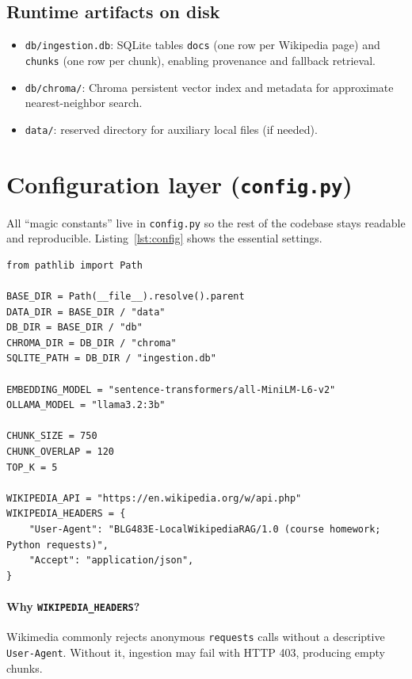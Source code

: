 \documentclass[11pt,a4paper]{article}
\begin{document}
\subsection{Runtime artifacts on disk}
\begin{itemize}[leftmargin=*]
  \item \texttt{db/ingestion.db}: SQLite tables \texttt{docs} (one row per Wikipedia page) and
        \texttt{chunks} (one row per chunk), enabling provenance and fallback retrieval.
  \item \texttt{db/chroma/}: Chroma persistent vector index and metadata for approximate
        nearest-neighbor search.
  \item \texttt{data/}: reserved directory for auxiliary local files (if needed).
\end{itemize}

\section{Configuration layer (\texttt{config.py})}

All ``magic constants'' live in \texttt{config.py} so the rest of the codebase stays readable
and reproducible. Listing~\ref{lst:config} shows the essential settings.

\begin{lstlisting}[caption={Central paths and model identifiers (\texttt{config.py}).},label={lst:config}]
from pathlib import Path

BASE_DIR = Path(__file__).resolve().parent
DATA_DIR = BASE_DIR / "data"
DB_DIR = BASE_DIR / "db"
CHROMA_DIR = DB_DIR / "chroma"
SQLITE_PATH = DB_DIR / "ingestion.db"

EMBEDDING_MODEL = "sentence-transformers/all-MiniLM-L6-v2"
OLLAMA_MODEL = "llama3.2:3b"

CHUNK_SIZE = 750
CHUNK_OVERLAP = 120
TOP_K = 5

WIKIPEDIA_API = "https://en.wikipedia.org/w/api.php"
WIKIPEDIA_HEADERS = {
    "User-Agent": "BLG483E-LocalWikipediaRAG/1.0 (course homework; Python requests)",
    "Accept": "application/json",
}
\end{lstlisting}

\paragraph{Why \texttt{WIKIPEDIA\_HEADERS}?}
Wikimedia commonly rejects anonymous \texttt{requests} calls without a descriptive
\texttt{User-Agent}. Without it, ingestion may fail with HTTP 403, producing empty chunks.
\end{document}
